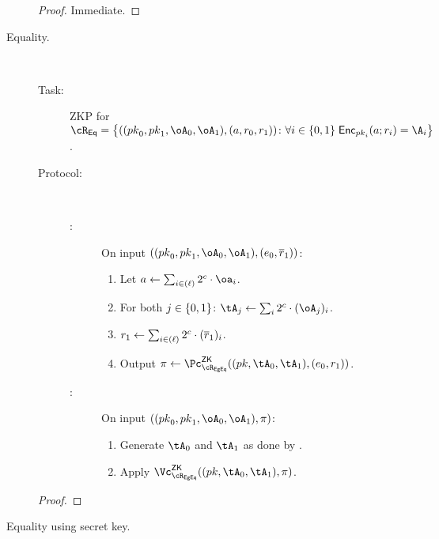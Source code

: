 \begin{description}
	\begin{proof}
		Immediate.
	\end{proof}
	
\item[Equality.]~ 

\begin{description}
	\item[Task:] ZKP for $\rEq =\rEqDef$.
	
	\item[Protocol:]~
	
	\begin{description}
		
	\item[\Pc:]  On input $((\pk_0,\pk_1,\oA_0,\oA_1),(e_0,\orr_1))$: 
	

	\begin{enumerate}
		
		\item Let  $a \asn  \sum_{i\in (\ell)}    2^c \cdot \oa_i$. 
		
		\item For both $j\in \zo$:  $\tA_j \asn  \sum_i  2^c \cdot (\oA_j)_i$. 
		
		  
		\item    $r_1 \leftarrow  \sum_{i\in (\ell)}  2^c \cdot (\overline{r}_1)_i$. 
			
		 
		\item Output $\pi \asn \pZK{\rEgEq}((\pk,\tA_0,\tA_1), (e_0,r_1))$.
				 
	\end{enumerate}
	
	\item[\Vc:] On input $((\pk_0,\pk_1,\oA_0,\oA_1),\pi)$: 
	
	\begin{enumerate}
		\item Generate $\tA_0$ and  $\tA_1$ as done by \Pc.
		
	\item Apply $\vZK{\rEgEq}((\pk,\tA_0,\tA_1), \pi)$.
	
	\end{enumerate}
\end{description}
	\end{description}
		

\begin{proof}
\end{proof}
  


\item[Equality using secret key.]~





\end{description}
